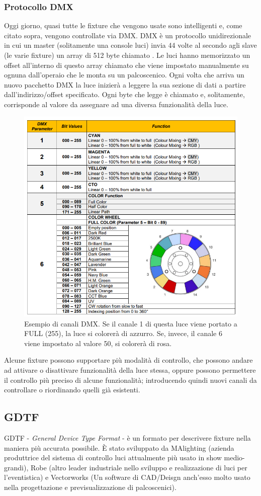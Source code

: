 \documentclass[main.tex]{subfiles}
\begin{document}
\subsubsection{Protocollo DMX}
Oggi giorno, quasi tutte le fixture che vengono usate sono intelligenti e, come citato sopra, vengono controllate via DMX. DMX è un protocollo unidirezionale in cui un master (solitamente una console luci) invia 44 volte al secondo agli slave (le varie fixture) un array di 512 byte chiamato . Le luci hanno memorizzato un offset all'interno di questo array chiamato  che viene impostato manualmente su ognuna dall'operaio che le monta su un palcoscenico. Ogni volta che arriva un nuovo pacchetto DMX la luce inizierà a leggere la sua sezione di dati a partire dall'indirizzo/offset specificato. Ogni byte che legge è chiamato  e, solitamente, corrisponde al valore da assegnare ad una diversa funzionalità della luce.
\begin{figure}[H]
    \centering
    \includegraphics[width=0.65\linewidth]{img/introduzione/dmxChannelDescExample.png}
    \caption{Esempio di canali DMX. Se il canale 1 di questa luce viene portato a FULL (255), la luce si colorerà di azzurro. Se, invece, il canale 6 viene impostato al valore 50, si colorerà di rosa.}
    \label{fig:dmxChannelsExample}
\end{figure}

Alcune fixture possono supportare più modalità di controllo, che possono andare ad attivare o disattivare funzionalità della luce stessa, oppure possono permettere il controllo più preciso di alcune funzionalità; introducendo quindi nuovi canali da controllare o riordinando quelli già esistenti. 


\subsection{GDTF}\label{subsec:1_gdtf}
GDTF - \textit{General Device Type Format} - è un formato per descrivere fixture nella maniera più accurata possibile. È stato sviluppato da MAlighting (azienda produttrice del sistema di controllo luci attualmente più usato in show medio-grandi), Robe (altro leader industriale nello sviluppo e realizzazione di luci per l'eventistica) e Vectorworks (Un software di CAD/Deisgn anch'esso molto usato nella progettazione e previsualizzazione di palcoscenici). 
\newline
\end{document}
